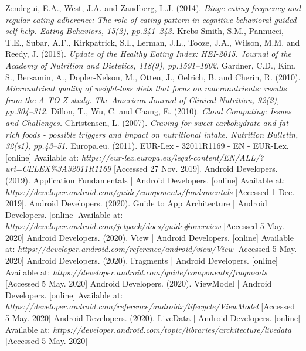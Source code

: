 \documentclass{article}
\begin{document}
\begin{thebibliography}{9}
Zendegui, E.A., West, J.A. and Zandberg, L.J. (2014). \textit{Binge eating frequency and regular eating adherence: The role of eating pattern in cognitive behavioral guided self-help. Eating Behaviors, 15(2), pp.241–243.}
Krebs-Smith, S.M., Pannucci, T.E., Subar, A.F., Kirkpatrick, S.I., Lerman, J.L., Tooze, J.A., Wilson, M.M. and Reedy, J. (2018). \textit{Update of the Healthy Eating Index: HEI-2015. Journal of the Academy of Nutrition and Dietetics, 118(9), pp.1591–1602.}
Gardner, C.D., Kim, S., Bersamin, A., Dopler-Nelson, M., Otten, J., Oelrich, B. and Cherin, R. (2010). \textit{Micronutrient quality of weight-loss diets that focus on macronutrients: results from the A TO Z study. The American Journal of Clinical Nutrition, 92(2), pp.304–312.}
Dillon, T., Wu, C. and Chang, E. (2010). \textit{Cloud Computing: Issues and Challenges.}
Christensen, L. (2007). \textit{Craving for sweet carbohydrate and fat-rich foods - possible triggers and impact on nutritional intake. Nutrition Bulletin, 32(s1), pp.43–51.}
Europa.eu. (2011). EUR-Lex - 32011R1169 - EN - EUR-Lex. [online] Available at: \textit{https://eur-lex.europa.eu/legal-content/EN/ALL/?uri=CELEX\%3A32011R1169} [Accessed 27 Nov. 2019].
Android Developers. (2019). Application Fundamentals  |  Android Developers. [online] Available at: \textit{https://developer.android.com/guide/components/fundamentals} [Accessed 1 Dec. 2019].
Android Developers. (2020). Guide to App Architecture | Android Developers. [online] Available at: \textit{https://developer.android.com/jetpack/docs/guide#overview} [Accessed 5 May. 2020]
Android Developers. (2020). View | Android Developers. [online] Available at: \textit{https://developer.android.com/reference/android/view/View} [Accessed 5 May. 2020]
Android Developers. (2020). Fragments | Android Developers. [online] Available at: 
\textit{https://developer.android.com/guide/components/fragments} [Accessed 5 May. 2020]
Android Developers. (2020). ViewModel | Android Developers. [online] Available at: 
\textit{https://developer.android.com/reference/androidx/lifecycle/ViewModel} [Accessed 5 May. 2020]
Android Developers. (2020). LiveData | Android Developers. [online] Available at: 
\textit{https://developer.android.com/topic/libraries/architecture/livedata} [Accessed 5 May. 2020]

\end{thebibliography}
\end{document}
